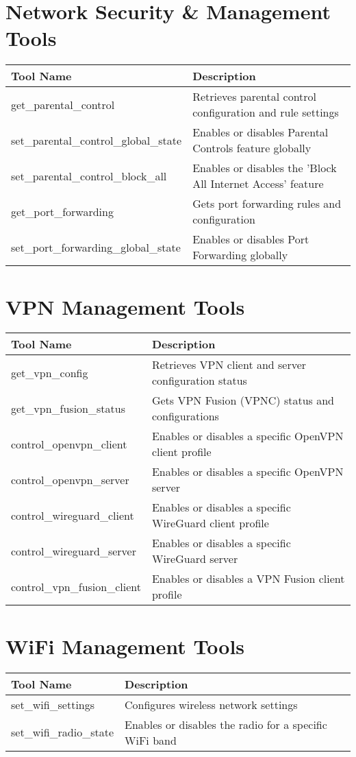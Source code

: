\section*{Network Security \& Management Tools}
\begin{tabular}{|p{6cm}|p{9cm}|}
\hline
\textbf{Tool Name} & \textbf{Description} \\
\hline
get\_parental\_control & Retrieves parental control configuration and rule settings \\
\hline
set\_parental\_control\_global\_state & Enables or disables Parental Controls feature globally \\
\hline
set\_parental\_control\_block\_all & Enables or disables the 'Block All Internet Access' feature \\
\hline
get\_port\_forwarding & Gets port forwarding rules and configuration \\
\hline
set\_port\_forwarding\_global\_state & Enables or disables Port Forwarding globally \\
\hline
\end{tabular}

\section*{VPN Management Tools}
\begin{tabular}{|p{6cm}|p{9cm}|}
\hline
\textbf{Tool Name} & \textbf{Description} \\
\hline
get\_vpn\_config & Retrieves VPN client and server configuration status \\
\hline
get\_vpn\_fusion\_status & Gets VPN Fusion (VPNC) status and configurations \\
\hline
control\_openvpn\_client & Enables or disables a specific OpenVPN client profile \\
\hline
control\_openvpn\_server & Enables or disables a specific OpenVPN server \\
\hline
control\_wireguard\_client & Enables or disables a specific WireGuard client profile \\
\hline
control\_wireguard\_server & Enables or disables a specific WireGuard server \\
\hline
control\_vpn\_fusion\_client & Enables or disables a VPN Fusion client profile \\
\hline
\end{tabular}

\section*{WiFi Management Tools}
\begin{tabular}{|p{6cm}|p{9cm}|}
\hline
\textbf{Tool Name} & \textbf{Description} \\
\hline
set\_wifi\_settings & Configures wireless network settings \\
\hline
set\_wifi\_radio\_state & Enables or disables the radio for a specific WiFi band \\
\hline
\end{tabular}

